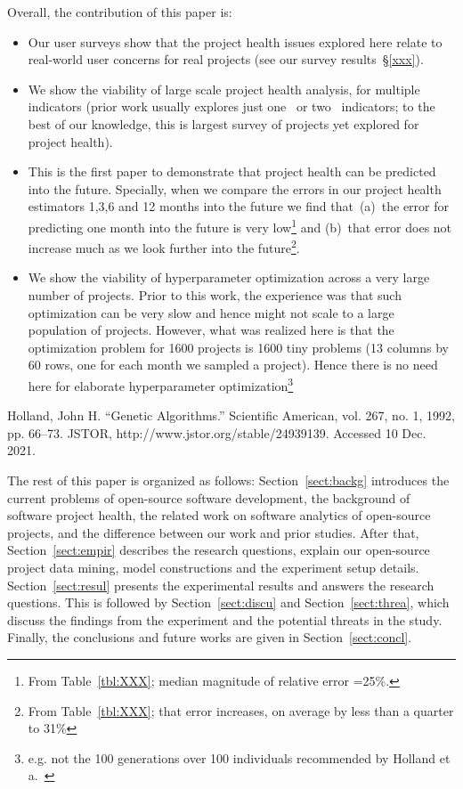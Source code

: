 \documentclass[smallextended]{svjour3}
\newcommand{\bi}{\begin{itemize}}
\newcommand{\ei}{\end{itemize}}
\newcommand{\tbl}[1]{Table~\ref{tbl:#1}}
\begin{document}
Overall, the contribution of this paper is:
\bi
\item Our user surveys show that the project health issues  explored here relate to real-world user concerns for real projects (see our survey results~\S\ref{xxx}).
\item We show the viability of large scale project health analysis, for multiple indicators (prior work usually explores just one~\cite{xx} or two~\cite{xx} indicators;
to the best of our knowledge, this is largest survey of projects yet explored for project health).
\item This is the first paper to demonstrate that project health can be predicted  into the future. Specially, when we compare the errors in our project health estimators 1,3,6 and 12 months into the future we find that~(a)~the error for predicting one month into the future is very low\footnote{
From \tbl{XXX}; median magnitude of relative error =25\%.} and (b)~that error does not increase much as we look further into the future\footnote{
From \tbl{XXX}; that error increases, on average by less than a quarter  to 31\%}.
\item We show the viability
of hyperparameter optimization
across a very large number of projects.
Prior to this work, the experience was that such optimization can be very slow and hence might not scale to a large population of projects. However, what was realized here is that the optimization problem
for 1600 projects is 1600 tiny problems (13 columns by 60 rows, one for each month we sampled a project). Hence there is no need here for elaborate hyperparameter optimization\footnote{e.g. not the 100 generations over 100 individuals recommended by Holland et a.~\cite{holland1992genetic}}
\ei
 

Holland, John H. “Genetic Algorithms.” Scientific American, vol. 267, no. 1, 1992, pp. 66–73. JSTOR, http://www.jstor.org/stable/24939139. Accessed 10 Dec. 2021. 


The rest of this paper is organized as follows:
Section~\ref{sect:backg} introduces the current problems of open-source software development, the background of software project health, the related work on software analytics of open-source projects, and the difference between our work and prior studies.
After that, Section~\ref{sect:empir} describes the research questions, explain our open-source project data mining, model constructions and the experiment setup details. 
Section~\ref{sect:resul} presents the experimental results and answers the research questions. 
This is followed by Section~\ref{sect:discu} and Section~\ref{sect:threa}, which discuss the findings from the experiment and the potential threats in the study. 
Finally, the conclusions and future works are given in Section~\ref{sect:concl}.
\end{document}
